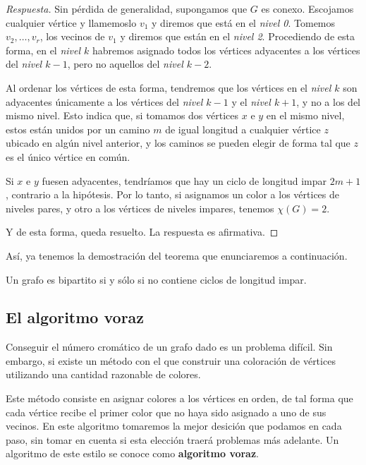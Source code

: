\begin{proof}[Respuesta]
    Sin pérdida de generalidad, supongamos que $G$ es conexo. Escojamos cualquier vértice y llamemoslo $v_1$ y diremos que está en el \textit{nivel 0}. Tomemos $v_2, \dots, v_r$, los vecinos de $v_1$ y diremos que están en el \textit{nivel 2}. Procediendo de esta forma, en el \textit{nivel $k$} habremos asignado todos los vértices adyacentes a los vértices del \textit{nivel $k-1$}, pero no aquellos del \textit{nivel $k-2$}.
    
    Al ordenar los vértices de esta forma, tendremos que los vértices en el \textit{nivel $k$} son adyacentes únicamente a los vértices del \textit{nivel $k-1$} y el \textit{nivel $k+1$}, y no a los del mismo nivel. Esto indica que, si tomamos dos vértices $x$ e $y$ en el mismo nivel, estos están unidos por un camino $m$ de igual longitud a cualquier vértice $z$ ubicado en algún nivel anterior, y los caminos se pueden elegir de forma tal que $z$ es el único vértice en común.
    
    Si $x$ e $y$ fuesen adyacentes, tendríamos que hay un ciclo de longitud impar $2m+1$, contrario a la hipótesis. Por lo tanto, si asignamos un color a los vértices de niveles pares, y otro a los vértices de niveles impares, tenemos $\chi(G)=2$.
    
    Y de esta forma, queda resuelto. La respuesta es afirmativa.
\end{proof}

Así, ya tenemos la demostración del teorema que enunciaremos a continuación.

\begin{teo}
    Un grafo es bipartito si y sólo si no contiene ciclos de longitud impar.
\end{teo}

\subsection{El algoritmo voraz}

Conseguir el número cromático de un grafo dado es un problema difícil. Sin embargo, si existe un método con el que construir una coloración de vértices utilizando una cantidad razonable de colores.

Este método consiste en asignar colores a los vértices en orden, de tal forma que cada vértice recibe el primer color que no haya sido asignado a uno de sus vecinos. En este algoritmo tomaremos la mejor desición que podamos en cada paso, sin tomar en cuenta si esta elección traerá problemas más adelante. Un algoritmo de este estilo se conoce como \textbf{algoritmo voraz}.

